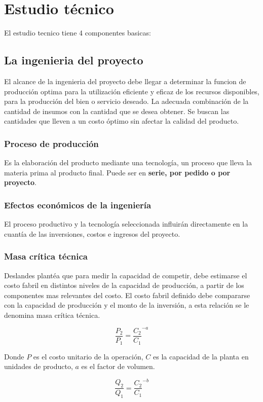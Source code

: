 \documentclass[a4paper, 11pt, oneside]{article}
\begin{document}
\section{Estudio técnico}
El estudio tecnico tiene 4 componentes basicas:

\subsection{La ingenieria del proyecto}
El alcance de la ingenieria del proyecto debe llegar a determinar la funcion de producción optima para la utilización eficiente
y eficaz de los recursos disponibles, para la producción del bien o servicio deseado. La adecuada combinación de la cantidad de
insumos con la cantidad que se desea obtener. Se buscan las cantidades que lleven a un costo óptimo sin afectar la calidad
del producto.

\subsubsection{Proceso de producción}
Es la elaboración del producto mediante una tecnología, un proceso que lleva la materia prima al producto 
final. Puede ser en {\bf serie, por pedido o por proyecto}.

\subsubsection{Efectos económicos de la ingeniería}
El proceso productivo y la tecnología seleccionada influirán directamente en la cuantía de las inversiones,
costos e ingresos del proyecto.

\subsubsection{Masa crítica técnica}
Deslandes plantéa que para medir la capacidad de competir, debe estimarse el costo fabril en distintos niveles de la
capacidad de producción, a partir de los componentes mas relevantes del costo. El costo fabril definido debe 
compararse con la capacidad de producción y el monto de la inversión, a esta relación se le denomina masa crítica
técnica.

	\[\frac{P_2}{P_1} = \frac{C_2}{C_1}^{-a} \]

Donde $P$ es el costo unitario de la operación, $C$ es la capacidad de la planta en unidades de producto, $a$ es el
factor de volumen.

	\[ \frac{Q_2}{Q_1} = \frac{C_2}{C_1}^{-b} \]
\end{document}
